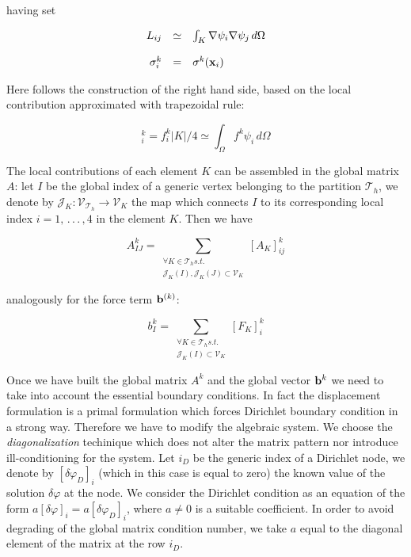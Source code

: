 having set

\begin{equation}
\begin{array}{rcl}
L_{ij} & \simeq & \int_K \nabla \psi_i  \nabla \psi_j \, d\Omega \\ \\
\sigma^k_i & =  &\sigma^k(\mathbf{x}_i)
\end{array}
\end{equation}

Here follows the construction of the right hand side, based on the local contribution approximated with trapezoidal rule:

\begin{equation}
[F_K]_i^k =  f^k_i |K| / 4 \simeq \int_{\Omega} f^k \psi_i \, d\Omega 
\end{equation}

The local contributions of each element $K$ can be assembled in the global matrix $A$: let $I$ be the global index of a generic vertex belonging to the partition $\mathcal{T}_h$, we denote by $\mathcal{J}_K: \mathcal{V}_{\mathcal{T}_h} \rightarrow \mathcal{V}_{K}$ the map which connects $I$ to its corresponding local index $i=1, \, . \, . \, . \, , 4$ in the element $K$. Then we have 

\begin{equation}
A_{IJ}^k = \sum_{\substack{\forall K \in \mathcal{T}_h s.t. \\ \mathcal{J}_K(I),\mathcal{J}_K(J) \subset \mathcal{V}_K}}
 [A_K]_{ij}^k
\end{equation}

analogously for the force term $\mathbf{b}^{(k)}$:

\begin{equation}
b_{I}^k = \sum_{\substack{\forall K \in \mathcal{T}_h s.t. \\ \mathcal{J}_K(I) \subset \mathcal{V}_K}}
 [F_K]_{i}^k
\end{equation}

Once we have built the global matrix $A^k$ and the global vector $\mathbf{b}^k$ we need to take into account the essential boundary conditions. In fact the displacement formulation is a primal formulation which forces Dirichlet boundary condition in a strong way. Therefore we have to modify the algebraic system. We choose the \textit{diagonalization} techinique which does not alter the matrix pattern nor introduce ill-conditioning for the system.  Let $i_D$ be the generic index of a Dirichlet node, we denote by $[\delta \varphi_{D}]_i$ (which in this case is equal to zero) the known value of the solution $\delta \varphi $ at the node. We consider the Dirichlet condition as an equation of the form $a [\delta \varphi]_i = a [\delta \varphi_{D}]_i$, where $a\neq 0$ is a suitable coefficient. In order to avoid degrading of the global matrix condition number, we take $a$ equal to the diagonal element of the matrix at the row  $i_D$.

